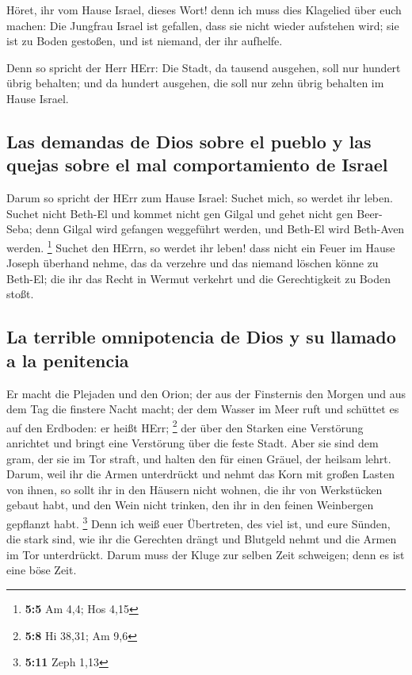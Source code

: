  Höret, ihr vom Hause Israel, dieses Wort! denn ich muss
dies Klagelied über euch machen:  Die Jungfrau Israel ist
gefallen, dass sie nicht wieder aufstehen wird; sie ist zu Boden
gestoßen, und ist niemand, der ihr aufhelfe.

 Denn so spricht der Herr HErr: Die Stadt, da tausend
ausgehen, soll nur hundert übrig behalten; und da hundert ausgehen, die
soll nur zehn übrig behalten im Hause Israel.

\hypertarget{las-demandas-de-dios-sobre-el-pueblo-y-las-quejas-sobre-el-mal-comportamiento-de-israel}{%
\subsection{Las demandas de Dios sobre el pueblo y las quejas sobre el
mal comportamiento de
Israel}\label{las-demandas-de-dios-sobre-el-pueblo-y-las-quejas-sobre-el-mal-comportamiento-de-israel}}

 Darum so spricht der HErr zum Hause Israel: Suchet mich,
so werdet ihr leben.  Suchet nicht Beth-El und kommet
nicht gen Gilgal und gehet nicht gen Beer-Seba; denn Gilgal wird
gefangen weggeführt werden, und Beth-El wird Beth-Aven werden.
\footnote{\textbf{5:5} Am 4,4; Hos 4,15}  Suchet den
HErrn, so werdet ihr leben! dass nicht ein Feuer im Hause Joseph
überhand nehme, das da verzehre und das niemand löschen könne zu
Beth-El;  die ihr das Recht in Wermut verkehrt und die
Gerechtigkeit zu Boden stoßt.

\hypertarget{la-terrible-omnipotencia-de-dios-y-su-llamado-a-la-penitencia}{%
\subsection{La terrible omnipotencia de Dios y su llamado a la
penitencia}\label{la-terrible-omnipotencia-de-dios-y-su-llamado-a-la-penitencia}}

 Er macht die Plejaden und den Orion; der aus der
Finsternis den Morgen und aus dem Tag die finstere Nacht macht; der dem
Wasser im Meer ruft und schüttet es auf den Erdboden: er heißt HErr;
\footnote{\textbf{5:8} Hi 38,31; Am 9,6}  der über den
Starken eine Verstörung anrichtet und bringt eine Verstörung über die
feste Stadt.  Aber sie sind dem gram, der sie im Tor
straft, und halten den für einen Gräuel, der heilsam lehrt.
 Darum, weil ihr die Armen unterdrückt und nehmt das Korn
mit großen Lasten von ihnen, so sollt ihr in den Häusern nicht wohnen,
die ihr von Werkstücken gebaut habt, und den Wein nicht trinken, den ihr
in den feinen Weinbergen gepflanzt habt. \footnote{\textbf{5:11} Zeph
  1,13}  Denn ich weiß euer Übertreten, des viel ist, und
eure Sünden, die stark sind, wie ihr die Gerechten drängt und Blutgeld
nehmt und die Armen im Tor unterdrückt.  Darum muss der
Kluge zur selben Zeit schweigen; denn es ist eine böse Zeit.

